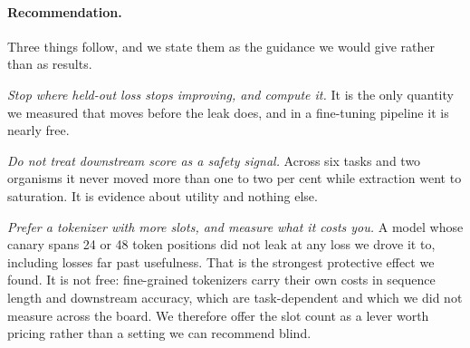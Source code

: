 \paragraph{Recommendation.}
Three things follow, and we state them as the guidance we would give rather than as results.

\emph{Stop where held-out loss stops improving, and compute it.} It is the only quantity we measured
that moves before the leak does, and in a fine-tuning pipeline it is nearly free.

\emph{Do not treat downstream score as a safety signal.} Across six tasks and two organisms it never
moved more than one to two per cent while extraction went to saturation. It is evidence about
utility and nothing else.

\emph{Prefer a tokenizer with more slots, and measure what it costs you.} A model whose canary spans
24 or 48 token positions did not leak at any loss we drove it to, including losses far past
usefulness. That is the strongest protective effect we found. It is not free: fine-grained
tokenizers carry their own costs in sequence length and downstream accuracy, which are
task-dependent and which we did not measure across the board. We therefore offer the slot count as a
lever worth pricing rather than a setting we can recommend blind.
